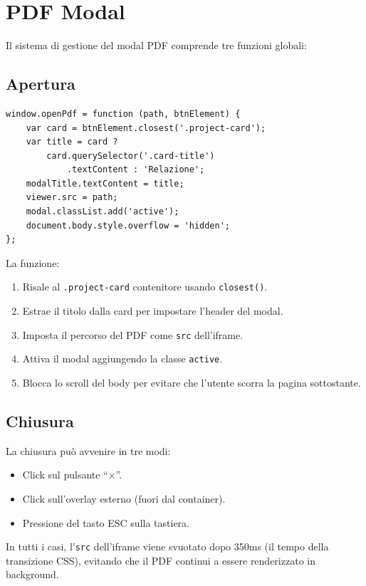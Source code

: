 \documentclass[a4paper,12pt]{report}
\begin{document}
\section{PDF Modal}

Il sistema di gestione del modal PDF comprende tre funzioni globali:

\subsection{Apertura}

\begin{lstlisting}[style=jsstyle, caption={Funzione openPdf}]
window.openPdf = function (path, btnElement) {
    var card = btnElement.closest('.project-card');
    var title = card ?
        card.querySelector('.card-title')
            .textContent : 'Relazione';
    modalTitle.textContent = title;
    viewer.src = path;
    modal.classList.add('active');
    document.body.style.overflow = 'hidden';
};
\end{lstlisting}

La funzione:
\begin{enumerate}[leftmargin=2cm]
    \item Risale al \texttt{.project-card} contenitore usando \texttt{closest()}.
    \item Estrae il titolo dalla card per impostare l'header del modal.
    \item Imposta il percorso del PDF come \texttt{src} dell'iframe.
    \item Attiva il modal aggiungendo la classe \texttt{active}.
    \item Blocca lo scroll del body per evitare che l'utente scorra la pagina sottostante.
\end{enumerate}

\subsection{Chiusura}

La chiusura pu\`o avvenire in tre modi:
\begin{itemize}[leftmargin=2cm]
    \item Click sul pulsante ``$\times$''.
    \item Click sull'overlay esterno (fuori dal container).
    \item Pressione del tasto ESC sulla tastiera.
\end{itemize}

In tutti i casi, l'\texttt{src} dell'iframe viene svuotato dopo 350ms (il tempo della transizione CSS), evitando che il PDF continui a essere renderizzato in background.
\end{document}
